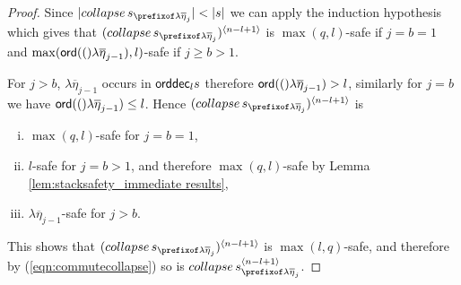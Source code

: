 \documentclass[a4paper]{article}
\theoremstyle{remark}
\theoremstyle{definition}
\newcommand\orddec{{\sf orddec}}
\begin{document}
\begin{proof}
Since $|collapse\,s_{\prefixof \lambda\overline\eta_j}| < |s|$ we can apply the induction hypothesis which gives that
$(collapse\,s_{\prefixof \lambda\overline\eta_j})^{\langle n-l+1\rangle}$ is $\max(q,l)$-safe
if $j=b=1$ and $\max({\sf ord}(()\lambda\overline\eta_{j-1}),l)$-safe if $j\geq b>1$.

For $j>b$, $\lambda\overline\eta_{j-1}$ occurs in $\orddec_l s$ therefore ${\sf ord}(()\lambda\overline\eta_{j-1}) > l$,
similarly for $j=b$ we have ${\sf ord}(()\lambda\overline\eta_{j-1}) \leq l$.
Hence $(collapse\,s_{\prefixof \lambda\overline\eta_j})^{\langle n-l+1\rangle}$ is
\begin{enumerate}[(i)]
\item $\max(q,l)$-safe for $j=b=1$,
\item $l$-safe for $j=b>1$, and therefore $\max(q,l)$-safe by Lemma \ref{lem:stacksafety_immediate results},
\item $\lambda\overline\eta_{j-1}$-safe for $j>b$.
\end{enumerate}
This shows that $(collapse\,s_{\prefixof \lambda\overline\eta_j})^{\langle n-l+1\rangle}$ is $\max(l,q)$-safe, and therefore by (\ref{eqn:commutecollapse})
so is $collapse\, s^{\langle n-l+1 \rangle}_{\prefixof \lambda \overline{\eta}_{j}}$.
\end{proof}
\end{document}
